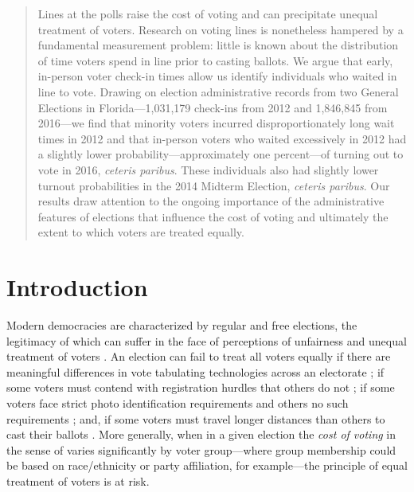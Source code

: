 \documentclass[12pt,titlepage]{article}
\begin{document}


\begin{abstract}
  \noindent 
  Lines at the polls raise the cost of voting and can precipitate
  unequal treatment of voters. \mbox{Research} on voting lines is
  nonetheless hampered by a fundamental measurement problem: little is
  known about the distribution of time voters spend in line prior to
  casting ballots. We argue that early, in-person voter check-in times
  allow us identify individuals who waited in line to vote. Drawing on
  election administrative records from two General Elections in
  Florida---1,031,179 check-ins from 2012 and 1,846,845 from 2016---we
  find that minority voters incurred disproportionately long wait
  times in 2012 and that in-person voters who waited excessively in
  2012 had a slightly lower probability---approximately one
  percent---of turning out to vote in 2016, \emph{ceteris paribus}.
  These individuals also had slightly lower turnout probabilities in
  the 2014 Midterm Election, \emph{ceteris paribus}.  Our results draw
  attention to the ongoing importance of the administrative features
  of elections that influence the cost of voting and ultimately the
  extent to which voters are treated equally.
\end{abstract}


\newpage
\section*{Introduction}

Modern democracies are characterized by regular and free elections,
the legitimacy of which can suffer in the face of perceptions of
unfairness and unequal treatment of voters
\citep{norris2014electoral}. An election can fail to treat all voters
equally if there are meaningful differences in vote tabulating
technologies across an electorate \citep{kimballkropf:tech}; if some
voters must contend with registration hurdles that others do not
\citep{ansolhersh:registration}; if some voters face strict photo
identification requirements and others no such requirements
\citep{benteleetal:newjimcrow}; and, if some voters must travel longer
distances than others to cast their ballots
\citep{dyckgimpel:distance, amos_etal2017}. More generally, when in a
given election the \emph{cost of voting} in the sense of
\cite{downs:econtheory} varies significantly by voter group---where
group membership could be based on race/ethnicity or party
affiliation, for example---the principle of equal treatment of voters
is at risk.
\end{document}
